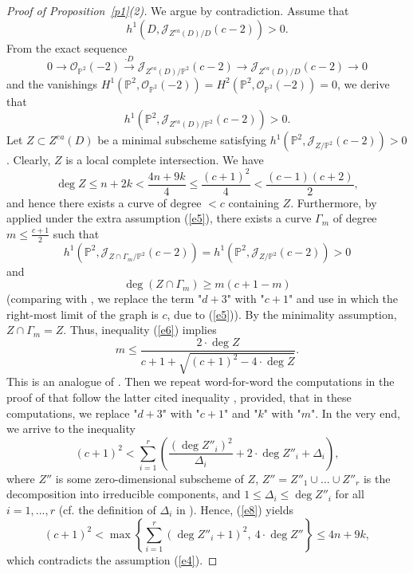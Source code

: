 \documentclass[11pt]{amsart}
\theoremstyle{definition}
\theoremstyle{remark}
\newcommand{\PP}{{\mathbb P}}
\begin{document}
\begin{proof}[Proof of Proposition~\ref{p1}(2)]
We argue by contradiction. Assume that
\[
h^1(D,{\mathcal J}_{Z^{ea}(D)/D}(c-2))>0.
\]
From the exact sequence
\[
0\to{\mathcal O}_{\PP^2}(-2)\overset{\cdot D}{\to}
{\mathcal J}_{Z^{ea}(D)/\PP^2}(c-2)\to
{\mathcal J}_{Z^{ea}(D)/D}(c-2)\to0
\]
and the vanishings $H^1(\PP^2,{\mathcal O}_{\PP^2}(-2))=H^2(\PP^2,{\mathcal O}_{\PP^2}(-2))=0$, we derive that
\[
h^1(\PP^2,{\mathcal J}_{Z^{ea}(D)/\PP^2}(c-2))>0.
\]
Let $Z\subset Z^{ea}(D)$ be a minimal subscheme satisfying $h^1(\PP^2,{\mathcal J}_{Z/\PP^2}(c-2))>0$. Clearly, $Z$ is a local complete intersection. We have
$$\deg Z\le n+2k<\frac{4n+9k}{4}\le\frac{(c+1)^2}{4}<\frac{(c-1)(c+2)}{2},$$
and hence there exists a curve of degree $<c$ containing $Z$. Furthermore, by \cite[Lemma 3.5.6]{GLS2} applied under the extra assumption (\ref{e5}), there exists a curve $\Gamma_m$ of degree $m\le\frac{c+1}{2}$ such that
$$h^1(\PP^2,{\mathcal J}_{Z\cap \Gamma_m/\PP^2}(c-2))=h^1(\PP^2,{\mathcal J}_{Z/\PP^2}(c-2))>0$$
and
\begin{equation}\deg(Z\cap \Gamma_m)\ge m(c+1-m)\label{e6}\end{equation}
(comparing with \cite[Lemma 3.5.6]{GLS2}, we replace the term "$d+3$" with "$c+1$" and use \cite[Figure 3.4]{GLS2} in which the right-most limit of the graph is $c$, due to (\ref{e5})). By the minimality assumption, $Z\cap \Gamma_m=Z$. Thus, inequality (\ref{e6}) implies
\begin{equation}m\le\frac{2\cdot\deg Z}{c+1+\sqrt{(c+1)^2-4\cdot\deg Z}}.\label{e7}\end{equation}
This is an analogue of \cite[Formula (3.5.0.8)]{GLS2}.
Then we repeat word-for-word the computations in the proof of \cite[Theorem 3.5.7]{GLS2} that follow the latter cited inequality
\cite[Formula (3.5.0.8)]{GLS2}, provided, that in these computations, we replace "$d+3$" with "$c+1$" and "$k$" with "$m$". In the very end, we arrive to the inequality
\begin{equation}(c+1)^2<\sum_{i=1}^r\left(\frac{(\deg Z''_i)^2}{\Delta_i}+2\cdot\deg Z''_i+\Delta_i\right),\label{e8}\end{equation}
where $Z''$ is some zero-dimensional subscheme of $Z$, $Z''=Z''_1\cup...\cup Z''_r$ is the decomposition into irreducible components, and $1\le\Delta_i\le\deg Z''_i$ for all $i=1,...,r$ (cf. the definition of $\Delta_i$ in \cite[Page 316]{GLS2}). Hence, (\ref{e8}) yields
$$(c+1)^2<\max\left\{\sum_{i=1}^r(\deg Z''_i+1)^2,\ 4\cdot\deg Z''\right\}\le4n+9k,$$
which contradicts the assumption (\ref{e4}).
\end{proof} 
\end{document}

